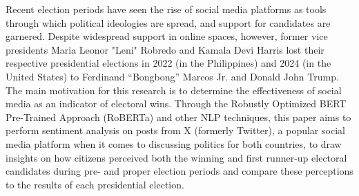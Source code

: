 \begin{thesisabstract}
Recent election periods have seen the rise of social media platforms as tools through which political ideologies are spread, and support for candidates are garnered. Despite widespread support in online spaces, however, former vice presidents Maria Leonor "Leni" Robredo and Kamala Devi Harris lost their respective presidential elections in 2022 (in the Philippines) and 2024 (in the United States) to Ferdinand “Bongbong” Marcos Jr. and Donald John Trump. The main motivation for this research is to determine the effectiveness of social media as an indicator of electoral wins. Through the Robustly Optimized BERT Pre-Trained Approach (RoBERTa) and other NLP techniques, this paper aims to perform sentiment analysis on posts from X (formerly Twitter), a popular social media platform when it comes to discussing politics for both countries, to draw insights on how citizens perceived both the winning and first runner-up electoral candidates during pre- and proper election periods and compare these perceptions to the results of each presidential election.
\end{thesisabstract}
